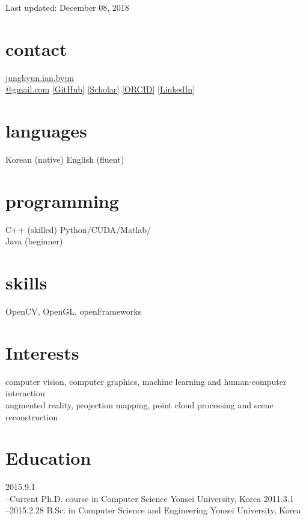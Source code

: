 \documentclass[]{friggeri-cv}
\begin{document}
       {Last updated: December 08, 2018}

\begin{aside}
  \section{contact}
    \href{mailto:junghyun.ian.byun@gmail.com}{junghyun.ian.byun\\@gmail.com}
    \href{https://github.com/IanByun}{[GitHub]}
    \href{https://scholar.google.co.kr/citations?user=JzneZIcAAAAJ}{[Scholar]}
    \href{https://orcid.org/0000-0002-1248-292X}{[ORCID]}
    \href{https://www.linkedin.com/in/junghyun-ian-byun/}{[LinkedIn]}
  \section{languages}
    Korean (native)
    English (fluent)
  \section{programming}
    C++ (skilled)
    Python/CUDA/Matlab/\\Java (beginner)
  \section{skills}
    OpenCV, OpenGL, openFrameworks
\end{aside}


\section{Interests}

computer vision, computer graphics, machine learning and human-computer interaction\\
augmented reality, projection mapping, point cloud processing and scene reconstruction

\section{Education}

\begin{entrylist}
  \entry
    {2015.9.1\\--Current}
    {Ph.D. {\normalfont course in Computer Science}}
    {Yonsei University, Korea}
    {}
  \entry
    {2011.3.1\\--2015.2.28}
    {B.Sc. {\normalfont in Computer Science and Engineering}}
    {Yonsei University, Korea}
    {}
\end{entrylist}
\end{document}
